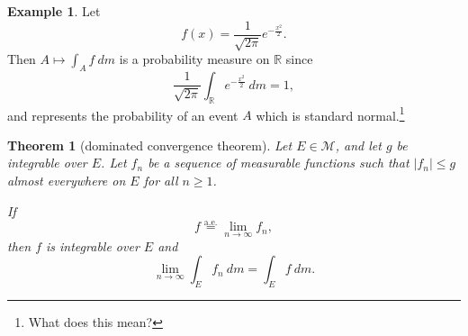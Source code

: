 \documentclass[a4paper]{scrartcl}
\newcommand{\R}{\mathbb{R}}
\theoremstyle{definition}
\newtheorem{example}{Example}[section]
\theoremstyle{plain}
\newtheorem{theorem}{Theorem}[section]
\theoremstyle{remark}
\begin{document}
\begin{example}
  Let
  \begin{equation*}
    f(x) = \frac{1}{\sqrt{2 \pi}} e^{-\frac{x^{2}}{2}}.
  \end{equation*}
  Then $A \mapsto \int_{A}f\ dm$ is a probability measure on $\R$ since
  \begin{equation*}
    \frac{1}{\sqrt{2\pi}} \int_{\R} e^{-\frac{x^2}{2}}\ dm = 1,
  \end{equation*}
  and represents the probability of an event $A$ which is standard normal.\footnote{What does this mean?}
\end{example}

\begin{theorem}[dominated convergence theorem]
  \label{thm:dominatedconvergencetheorem}
  Let $E \in \mathcal{M}$, and let $g$ be integrable over $E$. Let $f_{n}$ be a sequence of measurable functions such that $\left|f_{n}\right| \leq g$ almost everywhere on $E$ for all $n \geq 1$.

  If
  \begin{equation*}
    f \overset{\mathrm{a.e.}}{=} \lim_{n \to \infty} f_{n},
  \end{equation*}
  then $f$ is integrable over $E$ and
  \begin{equation*}
    \lim_{n \to \infty} \int_{E} f_{n}\ dm = \int_{E} f\ dm.
  \end{equation*}
\end{theorem}
\end{document}
